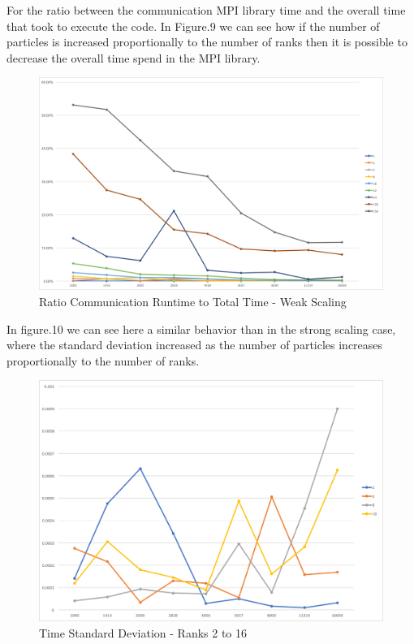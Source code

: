 \documentclass[12pt]{article} %
\begin{document}
\newpage

For the ratio between the communication MPI library time and the overall time that took to execute the code. In Figure.9 we can see how if the number of particles is increased proportionally to the number of ranks then it is possible to decrease the overall time spend in the MPI library.

\begin{figure}[htb]
\caption{Ratio Communication Runtime to Total Time - Weak Scaling}\label{fig:benchmark05}
\centering
\includegraphics[width=\textwidth,keepaspectratio]{imgs/img07.png}
\end{figure}

\newpage

In figure.10 we can see here a similar behavior than in the strong scaling case, where the standard deviation increased as the number of particles increases proportionally to the number of ranks.

\begin{figure}[htb]
\caption{Time Standard Deviation - Ranks 2 to 16 }\label{fig:benchmark05}
\centering
\includegraphics[width=\textwidth,keepaspectratio]{imgs/img010.png}
\end{figure}
\end{document}
